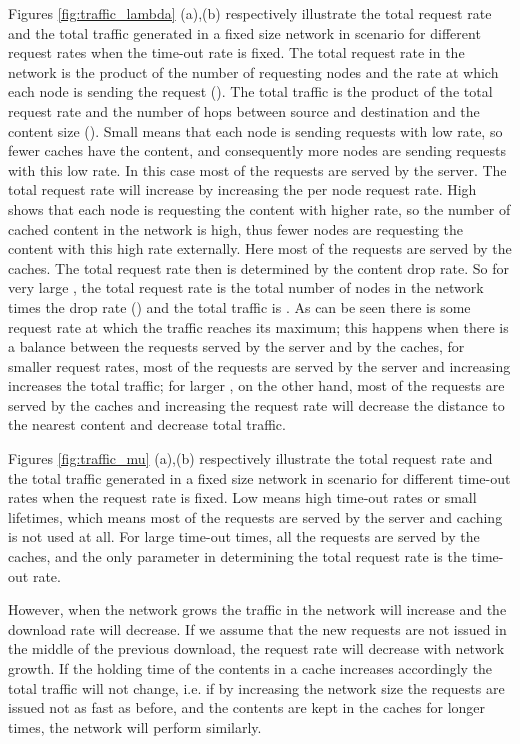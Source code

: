 \documentclass[journal]{IEEEtran}
\theoremstyle{plain}
\theoremstyle{remark}
\begin{document}
Figures \ref{fig:traffic_lambda} (a),(b) respectively illustrate the total request rate and the total traffic generated in a fixed size network in scenario  for different request rates when the time-out rate is fixed. The total request rate in the network is the product of the number of requesting nodes and the rate at which each node is sending the request (). The total traffic is the product of the total request rate and the number of hops between source and destination and the content size ().
Small  means that each node is sending requests with low rate, so fewer caches have the content, and consequently more nodes are sending requests with this low rate. In this case most of the requests are served by the server. The total request rate will increase by increasing the per node request rate. High  shows that each node is requesting the content with higher rate, so the number of cached content in the network is high, thus fewer nodes are requesting the content with this high rate externally. Here most of the requests are served by the caches. The total request rate then is determined by the content drop rate. So for very large , the total request rate is the total number of nodes in the network times the drop rate () and the total traffic is . As can be seen there is some request rate at which the traffic reaches its maximum; this happens when there is a balance between the requests served by the server and by the caches, for smaller request rates, most of the requests are served by the server and increasing  increases the total traffic; for larger , on the other hand, most of the requests are served by the caches and increasing the request rate will decrease the distance to the nearest content and decrease total traffic.

Figures \ref{fig:traffic_mu} (a),(b) respectively illustrate the total request rate and the total traffic generated in a fixed size network in scenario  for different time-out rates when the request rate is fixed. Low  means high time-out rates or small lifetimes, which means most of the requests are served by the server and caching is not used at all. For large time-out times, all the requests are served by the caches, and the only parameter in determining the total request rate is the time-out rate.

However, when the network grows the traffic in the network will increase and the download rate will decrease. If we assume that the new requests are not issued in the middle of the previous download, the request rate will decrease with network growth. If the holding time of the contents in a cache increases accordingly the total traffic will not change, i.e. if by increasing the network size the requests are issued not as fast as before, and the contents are kept in the caches for longer times, the network will perform similarly.
\end{document}
